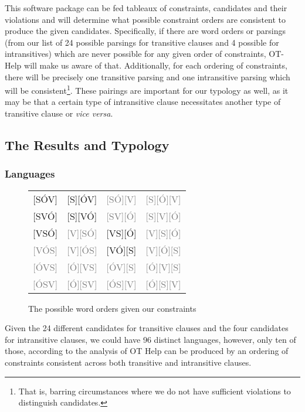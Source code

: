 \documentclass{article}
\begin{document}
This software package can be fed tableaux of constraints, candidates and their violations and will determine what possible constraint orders are consistent to produce the given candidates.
Specifically, if there are word orders or parsings (from our list of 24 possible parsings for transitive clauses and 4 possible for intransitives) which are never possible for any given order of constraints, OT-Help will make us aware of that.
Additionally, for each ordering of constraints, there will be precisely one transitive parsing and one intransitive parsing which will be consistent\footnote{That is, barring circumstances where we do not have sufficient violations to distinguish candidates.}.
These pairings are important for our typology as well, as it may be that a certain type of intransitive clause necessitates another type of transitive clause or \textit{vice versa}.

\subsection{The Results and Typology}

\subsubsection{Languages}

\newcommand{\no}{\textcolor{gray}}

\begin{figure}
	\begin{center}
	\begin{tabular}{cccc}
		{}[SÓV]&[S][ÓV]&\no{[SÓ][V]}&\no{[S][Ó][V]}\\
		{}[SVÓ]&[S][VÓ]&\no{[SV][Ó]}&\no{[S][V][Ó]}\\
		{}[VSÓ]&\no{[V][SÓ]}&[VS][Ó]&\no{[V][S][Ó]}\\
		{}\no{[VÓS]}&\no{[V][ÓS]}&[VÓ][S]&\no{[V][Ó][S]}\\
		{}\no{[ÓVS]}&\no{[Ó][VS]}&\no{[ÓV][S]}&\no{[Ó][V][S]}\\
		{}\no{[ÓSV]}&\no{[Ó][SV]}&\no{[ÓS][V]}&\no{[Ó][S][V]}\\
	\end{tabular}
	\end{center}
	\caption{The possible word orders given our constraints}
\end{figure}

Given the 24 different candidates for transitive clauses and the four candidates for intransitive clauses, we could have 96 distinct languages, however, only ten of those, according to the analysis of OT Help can be produced by an ordering of constraints consistent across both transitive and intransitive clauses.
\end{document}
